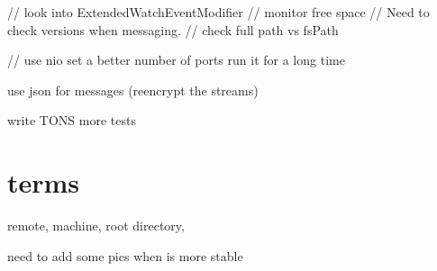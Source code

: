 \documentclass{article}
\begin{document}
		// look into ExtendedWatchEventModifier
		// monitor free space
		// Need to check versions when messaging.
		// check full path vs fsPath
		


 // use nio
 set a better number of ports
 run it for a long time


use json for messages (reencrypt the streams)





write TONS more tests





\section{terms}
remote, machine, root directory, 

need to add some pics when is more stable
\end{document}
